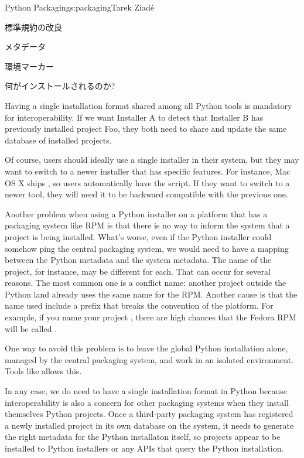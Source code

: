 \begin{aosachapter}{Python Packaging}{s:packaging}{Tarek Ziad\'{e}}
\begin{aosasect1}{標準規約の改良}
\begin{aosasect2}{メタデータ}
\begin{aosasect3}{環境マーカー}
\end{aosasect3}

\end{aosasect2}

\begin{aosasect2}{何がインストールされるのか?}

Having a single installation format shared among all Python tools is
mandatory for interoperability. If we want Installer A to detect that
Installer B has previously installed project Foo, they both need to
share and update the same database of installed projects.

Of course, users should ideally use a single installer in their
system, but they may want to switch to a newer installer that has
specific features. For instance, Mac OS X ships , so
users automatically have the  script. If they
want to switch to a newer tool, they will need it to be backward
compatible with the previous one.

Another problem when using a Python installer on a platform that has a
packaging system like RPM is that there is no way to inform the system
that a project is being installed. What's worse, even if the Python
installer could somehow ping the central packaging system, we would
need to have a mapping between the Python metadata and the system
metadata. The name of the project, for instance, may be different for
each. That can occur for several reasons. The most common one is 
a conflict name: another project outside the Python land already uses
the same name for the RPM. Another cause is that the name used include
a  prefix that breaks the convention of the platform.
For example, if you name your project , there are high
chances that the Fedora RPM will be called .

One way to avoid this problem is to leave the global Python
installation alone, managed by the central packaging system, and work
in an isolated environment.  Tools like  allows this.

In any case, we do need to have a single installation format in Python
because interoperability is also a concern for other packaging systems
when they install themselves Python projects.  Once a third-party 
packaging system has registered a newly installed project in its 
own database on the system, it needs to generate the right metadata 
for the Python installaton itself, so projects appear to be installed 
to Python installers or any APIs that query the Python installation.


\end{aosasect2}
\end{aosasect1}
\end{aosachapter}
